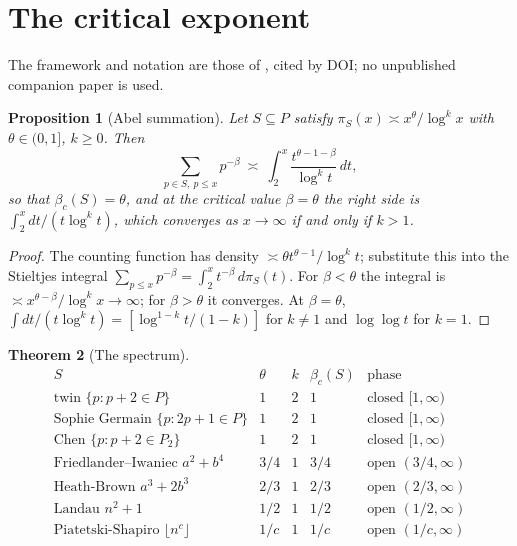 \documentclass[11pt]{amsart}
\numberwithin{equation}{section}
\newtheorem{theorem}{Theorem}[section]
\newtheorem{proposition}[theorem]{Proposition}
\theoremstyle{definition}
\theoremstyle{remark}
\begin{document}
\maketitle

\section{The critical exponent}

The framework and notation are those of \cite{Main}, cited by DOI; no unpublished companion
paper is used.

\begin{proposition}[Abel summation]\label{prop:abel}
Let $S\subseteq P$ satisfy $\pi_S(x)\asymp x^\theta/\log^kx$ with $\theta\in(0,1]$, $k\ge0$.
Then
\begin{equation}\label{eq:abel}
\sum_{p\in S,\ p\le x}p^{-\beta}\ \asymp\ \int_2^x\frac{t^{\theta-1-\beta}}{\log^kt}\,dt ,
\end{equation}
so that $\beta_c(S)=\theta$, and at the critical value $\beta=\theta$ the right side is
$\int_2^x dt/(t\log^kt)$, which converges as $x\to\infty$ if and only if $k>1$.
\end{proposition}

\begin{proof}
The counting function has density $\asymp\theta t^{\theta-1}/\log^kt$; substitute this into
the Stieltjes integral $\sum_{p\le x}p^{-\beta}=\int_2^xt^{-\beta}\,d\pi_S(t)$.
For $\beta<\theta$ the integral is
$\asymp x^{\theta-\beta}/\log^kx\to\infty$; for $\beta>\theta$ it converges. At
$\beta=\theta$, $\int dt/(t\log^kt)=[\log^{1-k}t/(1-k)]$ for $k\ne1$ and $\log\log t$ for
$k=1$.
\end{proof}

\begin{theorem}[The spectrum]\label{thm:spectrum}
\[
\begin{array}{lccll}
S & \theta & k & \beta_c(S) & \text{phase}\\\hline
\text{twin }\{p:p+2\in P\} & 1 & 2 & 1 & \text{closed }[1,\infty)\\
\text{Sophie Germain }\{p:2p+1\in P\} & 1 & 2 & 1 & \text{closed }[1,\infty)\\
\text{Chen }\{p:p+2\in P_2\} & 1 & 2 & 1 & \text{closed }[1,\infty)\\
\text{Friedlander--Iwaniec }a^2+b^4 & 3/4 & 1 & 3/4 & \text{open }(3/4,\infty)\\
\text{Heath-Brown }a^3+2b^3 & 2/3 & 1 & 2/3 & \text{open }(2/3,\infty)\\
\text{Landau }n^2+1 & 1/2 & 1 & 1/2 & \text{open }(1/2,\infty)\\
\text{Piatetski-Shapiro }\lfloor n^c\rfloor & 1/c & 1 & 1/c & \text{open }(1/c,\infty)
\end{array}
\]
\end{theorem}
\end{document}
